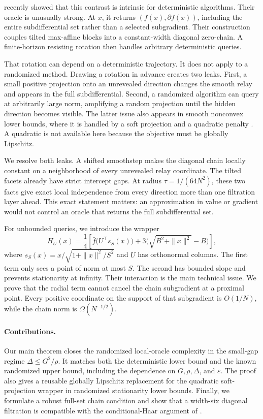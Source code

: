 \documentclass[twoside]{article}
\newcommand{\ve}{\varepsilon}
\begin{document}
\citet{li2026deterministic} recently showed that this contrast is intrinsic for deterministic algorithms. Their oracle is unusually strong. At $x$, it returns $(f(x),\partial f(x))$, including the entire subdifferential set rather than a selected subgradient. Their construction couples tilted max-affine blocks into a constant-width diagonal zero-chain. A finite-horizon resisting rotation then handles arbitrary deterministic queries.

That rotation can depend on a deterministic trajectory. It does not apply to a randomized method. Drawing a rotation in advance creates two leaks. First, a small positive projection onto an unrevealed direction changes the smooth relay and appears in the full subdifferential. Second, a randomized algorithm can query at arbitrarily large norm, amplifying a random projection until the hidden direction becomes visible. The latter issue also appears in smooth nonconvex lower bounds, where it is handled by a soft projection and a quadratic penalty \citep{carmon2020stationary}. A quadratic is not available here because the objective must be globally Lipschitz.

We resolve both leaks. A shifted smoothstep makes the diagonal chain locally constant on a neighborhood of every unrevealed relay coordinate. The tilted facets already have strict intercept gaps. At radius $\tau=1/(64N^2)$, these two facts give exact local independence from every direction more than one filtration layer ahead. This exact statement matters: an approximation in value or gradient would not control an oracle that returns the full subdifferential set.

For unbounded queries, we introduce the wrapper
\begin{equation}
 H_U(x)=\frac14\left[
 \bar f\bigl(U^\top s_S(x)\bigr)
 +3\bigl(\sqrt{B^2+\|x\|^2}-B\bigr)
 \right],
 \label{eq:wrapper}
\end{equation}
where $s_S(x)=x/\sqrt{1+\|x\|^2/S^2}$ and $U$ has orthonormal columns. The first term only sees a point of norm at most $S$. The second has bounded slope and prevents stationarity at infinity. Their interaction is the main technical issue. We prove that the radial term cannot cancel the chain subgradient at a proximal point. Every positive coordinate on the support of that subgradient is $O(1/N)$, while the chain norm is $\Omega(N^{-1/2})$.

\paragraph{Contributions.}
Our main theorem closes the randomized local-oracle complexity in the small-gap regime $\Delta\leq G^2/\rho$. It matches both the deterministic lower bound and the known randomized upper bound, including the dependence on $G,\rho,\Delta$, and $\ve$. The proof also gives a reusable globally Lipschitz replacement for the quadratic soft-projection wrapper in randomized stationarity lower bounds. Finally, we formulate a robust full-set chain condition and show that a width-six diagonal filtration is compatible with the conditional-Haar argument of \citet{carmon2020stationary}.
\end{document}

